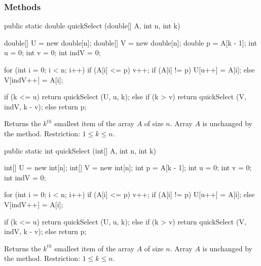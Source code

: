 \subsubsection* {Methods}
\begin{code}

   public static double quickSelect (double[] A, int n, int k)\begin{hide} {
      double[] U = new double[n];
      double[] V = new double[n];
      double p = A[k - 1];
      int u = 0;
      int v = 0;
      int indV = 0;

      for (int i = 0; i < n; i++) {
         if (A[i] <= p) {
            v++;
            if (A[i] != p) {
               U[u++] = A[i];
            }
         } else
            V[indV++] = A[i];
      }

      if (k <= u)
         return quickSelect (U, u, k);
      else if (k > v)
         return quickSelect (V, indV, k - v);
      else return p;
   }\end{hide}
\end{code}
\begin{tabb}
   Returns the $k^{th}$ smallest item of the array $A$ of size $n$.
   Array $A$ is unchanged by the method.
   Restriction: $1 \le k \le n$.
 \end{tabb}
\begin{htmlonly}
\end{htmlonly}
\begin{code}

   public static int quickSelect (int[] A, int n, int k)\begin{hide} {
      int[] U = new int[n];
      int[] V = new int[n];
      int p = A[k - 1];
      int u = 0;
      int v = 0;
      int indV = 0;

      for (int i = 0; i < n; i++) {
         if (A[i] <= p) {
            v++;
            if (A[i] != p) {
               U[u++] = A[i];
            }
         } else
            V[indV++] = A[i];
      }

      if (k <= u)
         return quickSelect (U, u, k);
      else if (k > v)
         return quickSelect (V, indV, k - v);
      else return p;
   }\end{hide}
\end{code}
\begin{tabb}
   Returns the $k^{th}$ smallest item of the array $A$ of size $n$.
   Array $A$ is unchanged by the method.
   Restriction: $1 \le k \le n$.
\end{tabb}
